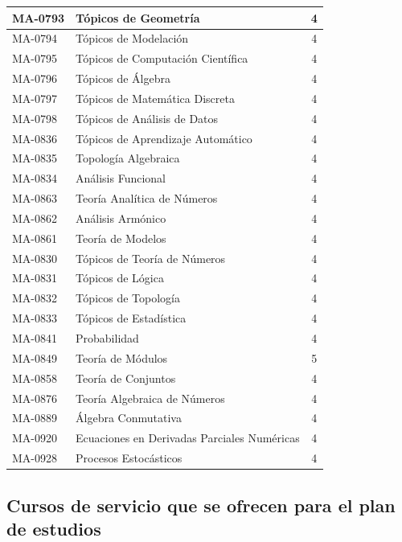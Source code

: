 \begin{longtable}{|l|>{\raggedright\arraybackslash}p{9.4cm}|c|}
MA-0793 & Tópicos de Geometría & 4 \\ \hline
MA-0794 & Tópicos de Modelación & 4 \\ \hline
MA-0795 & Tópicos de Computación Científica & 4 \\ \hline
MA-0796 & Tópicos de Álgebra & 4 \\ \hline
MA-0797 & Tópicos de Matemática Discreta & 4 \\ \hline
MA-0798 & Tópicos de Análisis de Datos & 4 \\ \hline
MA-0836 & Tópicos de Aprendizaje Automático & 4 \\ \hline
MA-0835 & Topología Algebraica & 4 \\ \hline
MA-0834 & Análisis Funcional & 4 \\ \hline
MA-0863 & Teoría Analítica de Números & 4 \\ \hline
MA-0862 & Análisis Armónico & 4 \\ \hline
MA-0861 & Teoría de Modelos & 4 \\ \hline
MA-0830 & Tópicos de Teoría de Números & 4 \\ \hline
MA-0831 & Tópicos de Lógica & 4 \\ \hline
MA-0832 & Tópicos de Topología & 4 \\ \hline
MA-0833 & Tópicos de Estadística & 4 \\ \hline
MA-0841 & Probabilidad & 4 \\ \hline
MA-0849 & Teoría de Módulos & 5 \\ \hline
MA-0858 & Teoría de Conjuntos & 4 \\ \hline
MA-0876 & Teoría Algebraica de Números & 4 \\ \hline
MA-0889 & Álgebra Conmutativa & 4 \\ \hline
MA-0920 & Ecuaciones en Derivadas Parciales Numéricas & 4 \\ \hline
MA-0928 & Procesos Estocásticos & 4 \\ \hline
\end{longtable}
\endgroup



\subsection*{Cursos de servicio que se ofrecen para el plan de estudios}

